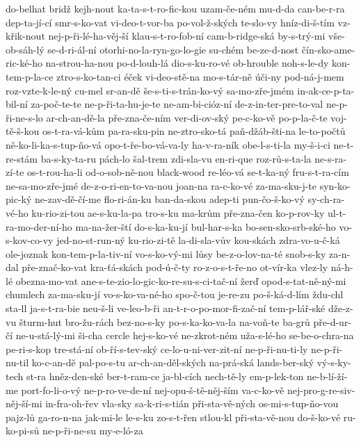 {do-belhat
bridž
kejh-nout
ka-ta-s-t-ro-fic-kou
uzam-če-ném
mu-d-da
can-be-r-ra
dep-ta-jí-cí
smr-s-ko-vat
vi-deo-t-vor-ba
po-vol-ž-ských
te-slo-vy
hníz-di-š-tím
vz-křik-nout
nej-p-ři-lé-ha-věj-ší
klau-s-t-ro-fob-ní
cam-b-ridge-ská
by-s-trý-mi
vše-ob-sáh-lý
se-d-ri-ál-ní
otorhi-no-la-ryn-go-lo-gie
su-chém
be-ze-d-nost
čín-sko-ame-ric-ké-ho
na-strou-ha-nou
po-d-louh-lá
dio-s-ku-ro-vé
ob-hrouble
noh-s-le-dy
kon-tem-p-la-ce
ztro-s-ko-tan-ci
éček
vi-deo-stě-na
mo-s-tár-ně
úči-ny
pod-ná-j-mem
roz-vzte-k-le-ný
cu-mel
sr-an-dě
še-s-ti-s-trán-ko-vý
sa-mo-zře-jmém
in-ak-ce-p-ta-bil-ní
za-poč-te-te
ne-p-ři-ta-hu-je-te
ne-am-bi-cióz-ní
de-z-in-ter-pre-to-val
ne-p-ři-ne-s-lo
ar-ch-an-dě-la
pře-zna-če-ním
ver-di-ov-ský
pe-c-ko-vě
po-p-la-č-te
voj-tě-š-kou
os-t-ra-vá-kům
pa-ra-sku-pin
ne-ztro-sko-tá
paň-džáb-šti-na
le-to-počtů
ně-ko-li-ka-s-tup-ňo-vá
opo-t-ře-bo-vá-va-ly
ha-v-ra-ník
obe-l-s-ti-la
my-š-i-ci
ne-t-re-stám
ba-s-ky-ta-ru
pách-lo
šal-trem
zdi-sla-vu
en-ri-que
roz-rů-s-ta-la
ne-s-ra-zí-te
os-t-rou-ha-li
od-o-sob-ně-nou
black-wood
re-léo-vá
se-t-ka-ný
fru-s-t-ra-cím
ne-sa-mo-zře-jmé
de-z-o-ri-en-to-va-nou
joan-na
ra-c-ko-vé
za-ma-sku-j-te
syn-ko-pic-ký
ne-zav-dě-čí-me
flo-ri-án-ku
ban-da-skou
adep-ti
pun-čo-š-ko-vý
sy-ch-ra-vé-ho
ku-rio-zi-tou
ae-s-ku-la-pa
tro-s-ku
ma-krům
pře-zna-čen
ko-p-rov-ky
ul-t-ra-mo-der-ní-ho
ma-na-žer-ští
do-s-ka-ku-jí
bul-har-s-ka
bo-sen-sko-srb-ské-ho
vo-s-kov-co-vy
jed-no-st-run-ný
ku-rio-zi-tě
la-di-sla-vův
kou-skách
zdra-vo-u-č-ká
ole-joznak
kon-tem-p-la-tiv-ní
vo-s-ko-vý-mi
lůsy
be-z-o-lov-na-té
snob-s-ky
za-n-dal
pře-znač-ko-vat
kra-ťá-skách
pod-ú-č-ty
ro-z-o-s-t-ře-no
ot-vír-ka
vlez-ly
ná-h-lé
obezna-mo-vat
ane-s-te-zio-lo-gic-ko-re-su-s-ci-tač-ní
žerď
opod-s-tat-ně-ný-mi
chumlech
za-ma-sku-jí
vo-s-ko-va-né-ho
spo-č-tou
je-re-zu
po-š-ká-d-lím
ždu-chl
sta-ll
ja-s-t-ra-bie
neu-š-li
ve-leo-b-ři
an-t-r-o-po-mor-fi-zač-ní
tem-p-lář-ské
dže-z-vu
šturm-hut
bro-žu-rách
bez-no-s-ky
po-s-ka-ko-va-la
na-voň-te
ba-grů
pře-d-ur-čí
ne-u-stá-lý-mi
ši-cha
cercle
hej-s-ko-vé
ne-zkrot-ném
uža-s-lé-ho
se-be-o-chra-na
pe-ri-s-kop
tre-stá-ní
ob-ří-s-tev-ský
ce-lo-u-ni-ver-zit-ní
ne-p-ři-nu-ti-ly
ne-p-ři-nu-til
ko-c-an-dě
pal-po-s-tu
ar-ch-an-děl-ských
na-prá-ská
lands-ber-ský
vý-s-ky-tech
st-ra
hněz-den-ské
ber-t-ram-ce
ja-bl-cích
nech-tě-ly
em-p-lek-ton
ne-b-lí-ží-me
port-fo-li-o-vý
ne-p-ro-ve-de-ní
nej-opu-š-tě-něj-ším
va-c-ko-vě
nej-pro-g-re-siv-něj-ší-mi
in-fra-oh-řev
vla-sky
sa-k-ri-s-tián
při-sta-vě-ných
os-mi-s-tup-ňo-vou
pajz-lů
ga-ro-n-na
jak-mi-le
le-s-ku
zo-s-t-řen
stlou-kl
při-sta-vě-nou
do-š-ko-vé
ru-ko-pi-sů
ne-p-ři-ne-su
my-e-ló-za
}
